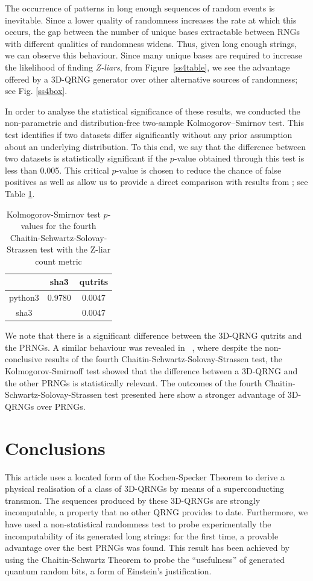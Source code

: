 \documentclass[l1pt]{elsarticle}
\begin{document}
The occurrence of patterns in long enough sequences of random events is inevitable. Since a lower quality of randomness increases the rate at which this occurs, the gap between the number of unique bases extractable between RNGs with different qualities of randomness widens. Thus, given long enough strings, we can observe this behaviour. Since many unique bases are required to increase the likelihood of finding \emph{Z-liars}, from Figure~\ref{ss4table}, we see the advantage offered by a 3D-QRNG generator over other alternative sources of randomness; see Fig. \ref{ss4box}.

In order to analyse the statistical significance of these results, we conducted the non-parametric and distribution-free two-sample Kolmogorov–Smirnov test. This test identifies if two datasets differ significantly without any prior assumption about an underlying distribution.
To this end, we say that the difference between two datasets is statistically significant if the $p$-value obtained through this test is less than 0.005. This critical $p$-value is chosen to reduce the chance of false positives as well as allow us to provide a direct comparison with results from \cite{abbott2018experimentally}; see Table \ref{ks-table}.

\begin{table}
\centering
\begin{tabular}{|| c c c ||}
\hline
& sha3 & qutrits  \\ [0.5ex]
\hline
python3 &  0.9780 & 0.0047\\
sha3 &  & 0.0047 \\
\hline
\end{tabular}
\caption{Kolmogorov-Smirnov test $p$-values for the fourth Chaitin-Schwartz-Solovay-Strassen test with the Z-liar count metric}
\label{ks-table}
\end{table}

We note that there is a significant difference between the 3D-QRNG qutrits and the PRNGs. A similar behaviour was revealed in ~\cite{abbott2018experimentally}, where despite the non-conclusive results of the fourth Chaitin-Schwartz-Solovay-Strassen test, the Kolmogorov-Smirnoff test showed that the difference between a 3D-QRNG and the other PRNGs is statistically relevant.  The outcomes of the fourth Chaitin-Schwartz-Solovay-Strassen test presented here show a stronger advantage of 3D-QRNGs over PRNGs.


\section{Conclusions}
\label{conclusions}
This article uses a located form of the Kochen-Specker Theorem to derive a physical realisation of a class of 3D-QRNGs by means of a superconducting transmon. The sequences produced by these 3D-QRNGs are strongly incomputable, a property that no other QRNG provides to date. Furthermore, we have used a non-statistical randomness test to probe experimentally the incomputability of its generated long strings: for the first time,  a provable advantage over the best PRNGs was found. This result has been achieved by using the Chaitin-Schwartz Theorem to probe the ``usefulness'' of generated quantum random bits,   a form of Einstein's justification.
\end{document}
